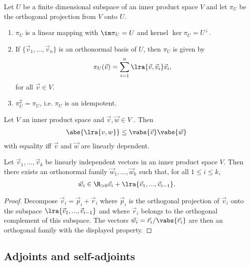\documentclass{article}
\begin{document}
\begin{proposition}[Proposition 5.2.4]
	Let $U$ be a finite dimensional subspace of an inner product space $V$ and let $\pi_U$ be the
	orthogonal projection from $V$ onto $U$.
	\begin{enumerate}
		\item $\pi_U$ is a linear mapping with $\im \pi_U=U$ and kernel $\ker \pi_U = U^\bot$.
		\item If $\{\vec v_1,...,\vec v_n\}$ is an orthonormal basis of $U$, then $\pi_U$ is given
		      by
		      \begin{align*}
			      \pi_U(\vec v)=\sum_{i=1}^n\lra{\vec v,\vec v_i}\vec v_i,
		      \end{align*}
		      for all $\vec v\in V$.
		\item $\pi_U^2=\pi_U$, i.e. $\pi_U$ is an idempotent.
	\end{enumerate}
\end{proposition}

\begin{theorem}
	Let $V$ an inner product space and $\vec v,\vec w\in V$ . Then
	\begin{align*}
		\abs{\lra{v,w}}\leq \vabs{\vec v}\vabs{\vec w}
	\end{align*}
	with equality iff $\vec v$ and $\vec w$ are linearly dependent.
\end{theorem}

\begin{theorem}[Theorem 5.2.7]
	Let $\vec v_1,...,\vec v_k$ be linearly independent vectors in an inner product space $V$. Then
	there exists an orthonormal family $\vec w_1,...,\vec w_k$ such that, for all $1\leq i\leq k$,
	\begin{align*}
		\vec w_i\in \R_{>0}\vec v_i + \lra{\vec v_1,...,\vec v_{i-1}}.
	\end{align*}
	\begin{proof}
		Decompose $\vec v_i=\vec p_i+\vec r_i$ where $\vec p_i$ is the orthogonal projection of $\vec v_i$
		onto the subspace $\lra{\vec v_1,...,\vec v_{i-1}}$ and where $\vec r_i$ belongs to the orthogonal
		complement of this subspace. The vectors $\vec w_i=\vec r_i/\vabs{\vec r_i}$ are then an orthogonal
		family with the displayed property.
	\end{proof}
\end{theorem}

\subsection{Adjoints and self-adjoints}
\end{document}
